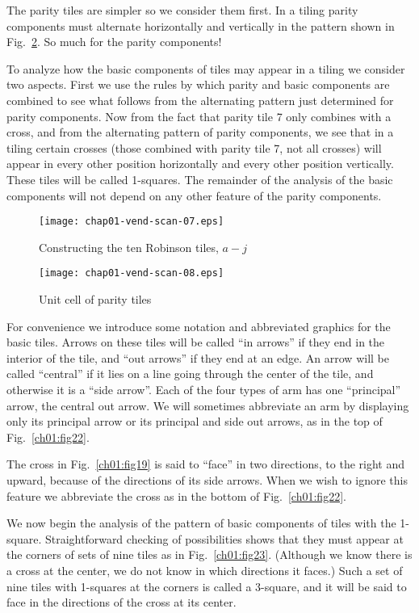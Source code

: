 \documentclass[reqno]{stml-l}
\theoremstyle{plain}
\theoremstyle{definition}
\numberwithin{equation}{chapter}
\begin{document}
The parity tiles are simpler so we consider them first. In a tiling parity components must alternate horizontally and vertically in the pattern shown in Fig.~\ref{ch01:fig21}. So much for the parity components!

To analyze how the basic components of tiles may appear in a tiling we consider two aspects. First we use the rules by which parity
and basic components are combined to see what follows from the alternating pattern just determined for parity components. Now from the fact that parity tile 7 only combines with a cross, and from the alternating pattern of parity components, we see that in a tiling certain crosses (those combined with parity tile 7, not all crosses) will appear in every other position horizontally and every other position vertically. These tiles will be called 1-squares. The remainder of the analysis of the basic components will not depend on any other feature of the parity components.

\begin{figure}[!h]
\texttt{[image: chap01-vend-scan-07.eps]}
\caption{Constructing the ten Robinson tiles,
$a-j$}\label{ch01:fig20}
\end{figure}

\begin{figure}[!h]
\texttt{[image: chap01-vend-scan-08.eps]}
\caption{Unit cell of parity tiles}\label{ch01:fig21}
\end{figure}

For convenience we introduce some notation and abbreviated graphics for the basic tiles. Arrows on these tiles will be called ``in arrows'' if they end in the interior of the tile, and ``out arrows'' if they end at an edge. An arrow will be called ``central'' if it lies on a line going through the center of the tile, and otherwise it is a ``side arrow''. Each of the four types of arm has one ``principal'' arrow, the central out arrow. We will sometimes abbreviate an arm by displaying only its principal arrow or its principal and side out arrows, as in the top of Fig.~\ref{ch01:fig22}.

The cross in Fig.~\ref{ch01:fig19} is said to ``face'' in two directions, to the right and upward, because of the directions of its side arrows. When we wish to ignore this feature we abbreviate the cross as in the bottom of Fig.~\ref{ch01:fig22}.

We now begin the analysis of the pattern of basic components of tiles with the 1-square. Straightforward checking of possibilities shows that they must appear at the corners of sets of nine tiles as in Fig.~\ref{ch01:fig23}. (Although we know there is a cross at the center, we do not know in which directions it faces.) Such a set of nine tiles with 1-squares at the corners is called a 3-square, and it will be said to face in the directions of the cross at its center.
\end{document}

